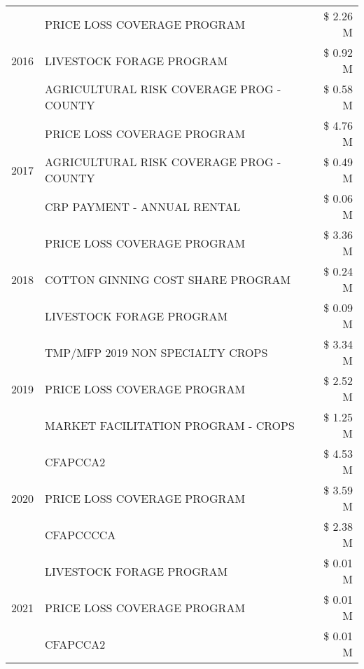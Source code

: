 \begin{tabular}{llr}
\cline{1-3}
\multirow[t]{3}{*}{2016} & PRICE LOSS COVERAGE PROGRAM & \$ 2.26 M \\
 & LIVESTOCK FORAGE PROGRAM & \$ 0.92 M \\
 & AGRICULTURAL RISK COVERAGE PROG - COUNTY & \$ 0.58 M \\
\cline{1-3}
\multirow[t]{3}{*}{2017} & PRICE LOSS COVERAGE PROGRAM & \$ 4.76 M \\
 & AGRICULTURAL RISK COVERAGE PROG - COUNTY & \$ 0.49 M \\
 & CRP PAYMENT - ANNUAL RENTAL & \$ 0.06 M \\
\cline{1-3}
\multirow[t]{3}{*}{2018} & PRICE LOSS COVERAGE PROGRAM & \$ 3.36 M \\
 & COTTON GINNING COST SHARE PROGRAM & \$ 0.24 M \\
 & LIVESTOCK FORAGE PROGRAM & \$ 0.09 M \\
\cline{1-3}
\multirow[t]{3}{*}{2019} & TMP/MFP 2019 NON SPECIALTY CROPS & \$ 3.34 M \\
 & PRICE LOSS COVERAGE PROGRAM & \$ 2.52 M \\
 & MARKET FACILITATION PROGRAM - CROPS & \$ 1.25 M \\
\cline{1-3}
\multirow[t]{3}{*}{2020} & CFAPCCA2 & \$ 4.53 M \\
 & PRICE LOSS COVERAGE PROGRAM & \$ 3.59 M \\
 & CFAPCCCCA & \$ 2.38 M \\
\cline{1-3}
\multirow[t]{3}{*}{2021} & LIVESTOCK FORAGE PROGRAM & \$ 0.01 M \\
 & PRICE LOSS COVERAGE PROGRAM & \$ 0.01 M \\
 & CFAPCCA2 & \$ 0.01 M \\
\cline{1-3}
\bottomrule
\end{tabular}
